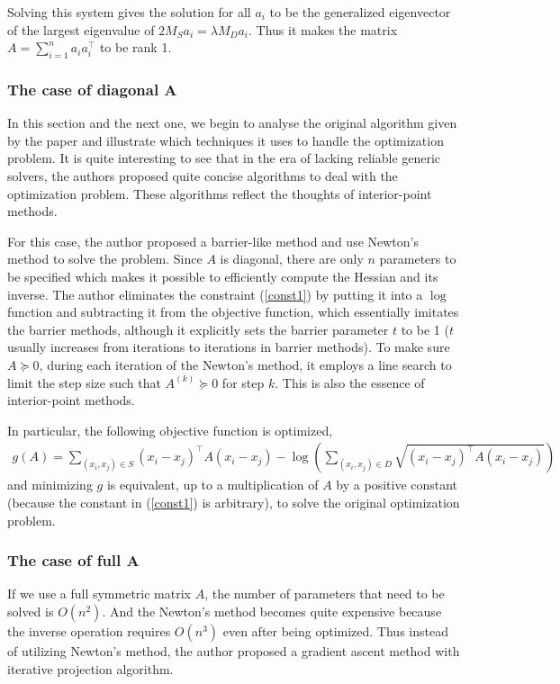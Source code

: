 \documentclass[12pt]{article}
\newcommand\T{^\top}
\begin{document}
Solving this system gives the solution for all $a_i$ to be the generalized eigenvector of the largest eigenvalue of $2M_Sa_i=\lambda M_Da_i$. Thus it makes the matrix $A=\sum_{i=1}^n a_i a_i\T$ to be rank 1.

\subsubsection{The case of diagonal A}
In this section and the next one, we begin to analyse the original algorithm given by the paper and illustrate which techniques it uses to handle the optimization problem. It is quite interesting to see that in the era of lacking reliable generic solvers, the authors proposed quite concise algorithms to deal with the optimization problem. These algorithms reflect the thoughts of interior-point methods.

For this case, the author proposed a barrier-like method and use Newton's method to solve the problem. Since $A$ is diagonal, there are only $n$ parameters to be specified which makes it possible to efficiently compute the Hessian and its inverse. The author eliminates the constraint (\ref{const1}) by putting it into a $\log$ function and subtracting it from the objective function, which essentially imitates the barrier methods, although it explicitly sets the barrier parameter $t$ to be 1 ($t$ usually increases from iterations to iterations in barrier methods). To make sure $A\succeq 0$, during each iteration of the Newton's method, it employs a line search to limit the step size such that $A^{(k)}\succeq 0$ for step $k$. This is also the essence of interior-point methods.

In particular, the following objective function is optimized,
\begin{align*}
 g(A) =  \sum_{(x_i,x_j)\in S} (x_i-x_j)\T A(x_i-x_j) -\log\left(\sum_{(x_i,x_j)\in D} \sqrt{(x_i-x_j)\T A(x_i-x_j)}\right)
\end{align*}
and minimizing $g$ is equivalent, up to a multiplication of $A$ by a positive constant (because the constant in (\ref{const1}) is arbitrary), to solve the original optimization problem.


\subsubsection{The case of full A}

If we use a full symmetric matrix $A$, the number of parameters that need to be solved is $O(n^2)$. And the Newton's method becomes quite expensive because the inverse operation requires $O(n^3)$ even after being optimized. Thus instead of utilizing Newton's method, the author proposed a gradient ascent method with iterative projection algorithm. 
\end{document}
